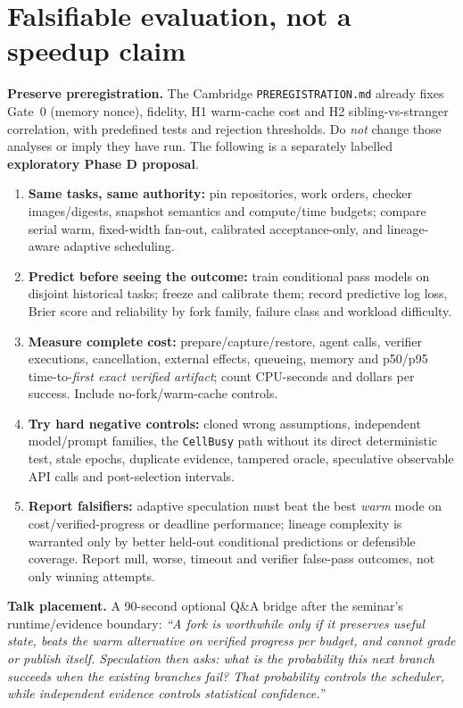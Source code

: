 \documentclass[10pt,twocolumn]{article}
\newcommand{\1}{\mathbf{1}}
\begin{document}
\section{Falsifiable evaluation, not a speedup claim}

\textbf{Preserve preregistration.} The Cambridge \texttt{PREREGISTRATION.md} already fixes Gate~0 (memory nonce), fidelity, H1 warm-cache cost and H2 sibling-vs-stranger correlation, with predefined tests and rejection thresholds. Do \emph{not} change those analyses or imply they have run. The following is a separately labelled \textbf{exploratory Phase D proposal}.

\begin{enumerate}[leftmargin=*,itemsep=1pt,topsep=2pt]
\item \textbf{Same tasks, same authority:} pin repositories, work orders, checker images/digests, snapshot semantics and compute/time budgets; compare serial warm, fixed-width fan-out, calibrated acceptance-only, and lineage-aware adaptive scheduling.
\item \textbf{Predict before seeing the outcome:} train conditional pass models on disjoint historical tasks; freeze and calibrate them; record predictive log loss, Brier score and reliability by fork family, failure class and workload difficulty.
\item \textbf{Measure complete cost:} prepare/capture/restore, agent calls, verifier executions, cancellation, external effects, queueing, memory and p50/p95 time-to-\emph{first exact verified artifact}; count CPU-seconds and dollars per success. Include no-fork/warm-cache controls.
\item \textbf{Try hard negative controls:} cloned wrong assumptions, independent model/prompt families, the \texttt{CellBusy} path without its direct deterministic test, stale epochs, duplicate evidence, tampered oracle, speculative observable API calls and post-selection intervals.
\item \textbf{Report falsifiers:} adaptive speculation must beat the best \emph{warm} mode on cost/verified-progress or deadline performance; lineage complexity is warranted only by better held-out conditional predictions or defensible coverage. Report null, worse, timeout and verifier false-pass outcomes, not only winning attempts.
\end{enumerate}

\textbf{Talk placement.} A 90-second optional Q\&A bridge after the seminar's runtime/evidence boundary: \emph{``A fork is worthwhile only if it preserves useful state, beats the warm alternative on verified progress per budget, and cannot grade or publish itself. Speculation then asks: what is the probability this \emph{next} branch succeeds \emph{when the existing branches fail}? That probability controls the scheduler, while independent evidence controls statistical confidence.''}
\end{document}
